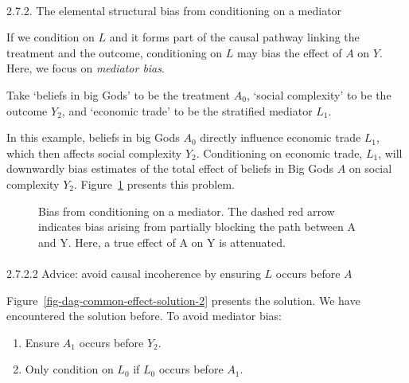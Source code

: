 \documentclass[
  singlecolumn]{article}
\makeatletter
\let\oldparagraph\paragraph
\renewcommand{\paragraph}{
    \@ifstar
      \xxxParagraphStar
      \xxxParagraphNoStar
  }
\newcommand{\xxxParagraphStar}[1]{\oldparagraph*{#1}\mbox{}}
\newcommand{\xxxParagraphNoStar}[1]{\oldparagraph{#1}\mbox{}}
\providecommand{\tightlist}{%
  \setlength{\itemsep}{0pt}\setlength{\parskip}{0pt}}\usepackage{longtable,booktabs,array}
\makeatother
\begin{document}
\paragraph{2.7.2. The elemental structural bias from conditioning on a
mediator}\label{the-elemental-structural-bias-from-conditioning-on-a-mediator}

If we condition on \(L\) and it forms part of the causal pathway linking
the treatment and the outcome, conditioning on \(L\) may bias the effect
of \(A\) on \(Y\). Here, we focus on \emph{mediator bias}.

Take `beliefs in big Gods' to be the treatment \(A_{0}\), `social
complexity' to be the outcome \(Y_{2}\), and `economic trade' to be the
stratified mediator \(L_{1}\).

In this example, beliefs in big Gods \(A_{0}\) directly influence
economic trade \(L_{1}\), which then affects social complexity
\(Y_{2}\). Conditioning on economic trade, \(L_{1}\), will downwardly
bias estimates of the total effect of beliefs in Big Gods \(A\) on
social complexity \(Y_{2}\). Figure~\ref{fig-dag-mediator} presents this
problem.

\begin{figure}


\caption{\label{fig-dag-mediator}Bias from conditioning on a mediator.
The dashed red arrow indicates bias arising from partially blocking the
path between A and Y. Here, a true effect of A on Y is attenuated.}

\end{figure}%

\paragraph{\texorpdfstring{2.7.2.2 Advice: avoid causal incoherence by
ensuring \(L\) occurs before
\(A\)}{2.7.2.2 Advice: avoid causal incoherence by ensuring L occurs before A}}\label{advice-avoid-causal-incoherence-by-ensuring-l-occurs-before-a-1}

Figure~\ref{fig-dag-common-effect-solution-2} presents the solution. We
have encountered the solution before. To avoid mediator bias:

\begin{enumerate}
\def\labelenumi{\arabic{enumi}.}
\tightlist
\item
  Ensure \(A_1\) occurs before \(Y_2\).
\item
  Only condition on \(L_0\) if \(L_0\) occurs before \(A_1\).
\end{enumerate}
\end{document}
